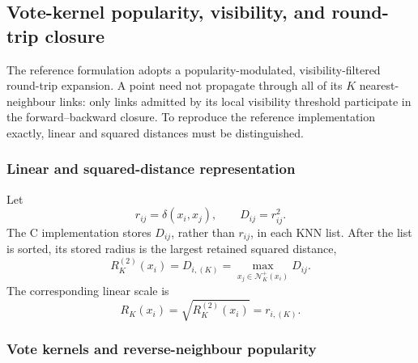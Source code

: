\documentclass[review,12pt]{elsarticle}
\newcommand{\calN}{\mathcal{N}}
\begin{document}
\subsection{Vote-kernel popularity, visibility, and round-trip closure}\label{sec:visibility_closure}

The reference formulation adopts a popularity-modulated, visibility-filtered round-trip expansion. A point need not propagate through all of its $K$ nearest-neighbour links: only links admitted by its local visibility threshold participate in the forward--backward closure. To reproduce the reference implementation exactly, linear and squared distances must be distinguished.

\subsubsection{Linear and squared-distance representation}

Let
\begin{equation}
r_{ij}=\delta(x_i,x_j),
\qquad
D_{ij}=r_{ij}^{2}.
\label{eq:linear_squared_distance}
\end{equation}
The C implementation stores $D_{ij}$, rather than $r_{ij}$, in each KNN list. After the list is sorted, its stored radius is the largest retained squared distance,
\begin{equation}
R_K^{(2)}(x_i)=D_{i,(K)}
=\max_{x_j\in\calN_K^+(x_i)}D_{ij}.
\label{eq:squared_knn_radius}
\end{equation}
The corresponding linear scale is
\begin{equation}
R_K(x_i)=\sqrt{R_K^{(2)}(x_i)}=r_{i,(K)}.
\label{eq:linear_knn_radius}
\end{equation}

\subsubsection{Vote kernels and reverse-neighbour popularity}
\end{document}
